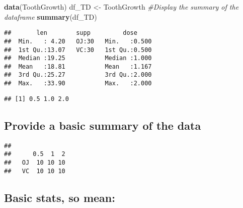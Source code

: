 \documentclass[]{article}
\newenvironment{Shaded}{\begin{snugshade}}{\end{snugshade}}
\newcommand{\CommentTok}[1]{\textcolor[rgb]{0.56,0.35,0.01}{\textit{#1}}}
\newcommand{\KeywordTok}[1]{\textcolor[rgb]{0.13,0.29,0.53}{\textbf{#1}}}
\newcommand{\NormalTok}[1]{#1}
\newcommand{\OperatorTok}[1]{\textcolor[rgb]{0.81,0.36,0.00}{\textbf{#1}}}
\newcommand{\StringTok}[1]{\textcolor[rgb]{0.31,0.60,0.02}{#1}}
\begin{document}
\begin{Shaded}
\begin{Highlighting}[]
\KeywordTok{data}\NormalTok{(ToothGrowth)}
\NormalTok{df_TD <-}\StringTok{ }\NormalTok{ToothGrowth}
\CommentTok{#Display the summary of the dataframe}
\KeywordTok{summary}\NormalTok{(df_TD)}
\end{Highlighting}
\end{Shaded}

\begin{verbatim}
##       len        supp         dose      
##  Min.   : 4.20   OJ:30   Min.   :0.500  
##  1st Qu.:13.07   VC:30   1st Qu.:0.500  
##  Median :19.25           Median :1.000  
##  Mean   :18.81           Mean   :1.167  
##  3rd Qu.:25.27           3rd Qu.:2.000  
##  Max.   :33.90           Max.   :2.000
\end{verbatim}

\begin{Shaded}
\end{Shaded}

\begin{verbatim}
## [1] 0.5 1.0 2.0
\end{verbatim}

\hypertarget{provide-a-basic-summary-of-the-data}{%
\subsection{Provide a basic summary of the
data}\label{provide-a-basic-summary-of-the-data}}

\begin{Shaded}
\end{Shaded}

\begin{verbatim}
##     
##      0.5  1  2
##   OJ  10 10 10
##   VC  10 10 10
\end{verbatim}

\hypertarget{basic-stats-so-mean}{%
\subsection{Basic stats, so mean:}\label{basic-stats-so-mean}}
\end{document}
